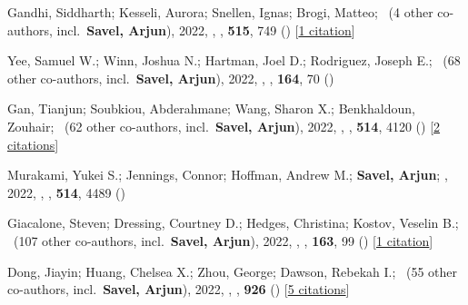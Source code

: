\item[{\color{numcolor}\scriptsize14}] Gandhi, Siddharth; Kesseli, Aurora; Snellen, Ignas; Brogi, Matteo; \etal\ ({4} other co-authors, incl.\ \textbf{Savel, Arjun}), 2022, , \mnras, \textbf{515}, 749 () [\href{https://ui.adsabs.harvard.edu/abs/2022MNRAS.515..749G}{1 citation}]

\item[{\color{numcolor}\scriptsize13}] Yee, Samuel W.; Winn, Joshua N.; Hartman, Joel D.; Rodriguez, Joseph E.; \etal\ ({68} other co-authors, incl.\ \textbf{Savel, Arjun}), 2022, , \aj, \textbf{164}, 70 ()

\item[{\color{numcolor}\scriptsize12}] Gan, Tianjun; Soubkiou, Abderahmane; Wang, Sharon X.; Benkhaldoun, Zouhair; \etal\ ({62} other co-authors, incl.\ \textbf{Savel, Arjun}), 2022, , \mnras, \textbf{514}, 4120 () [\href{https://ui.adsabs.harvard.edu/abs/2022MNRAS.514.4120G}{2 citations}]

\item[{\color{numcolor}\scriptsize11}] Murakami, Yukei S.; Jennings, Connor; Hoffman, Andrew M.; \textbf{Savel, Arjun}; \etal, 2022, , \mnras, \textbf{514}, 4489 ()

\item[{\color{numcolor}\scriptsize10}] Giacalone, Steven; Dressing, Courtney D.; Hedges, Christina; Kostov, Veselin B.; \etal\ ({107} other co-authors, incl.\ \textbf{Savel, Arjun}), 2022, , \aj, \textbf{163}, 99 () [\href{https://ui.adsabs.harvard.edu/abs/2022AJ....163...99G}{1 citation}]

\item[{\color{numcolor}\scriptsize9}] Dong, Jiayin; Huang, Chelsea X.; Zhou, George; Dawson, Rebekah I.; \etal\ ({55} other co-authors, incl.\ \textbf{Savel, Arjun}), 2022, , \apj, \textbf{926} () [\href{https://ui.adsabs.harvard.edu/abs/2022ApJ...926L...7D}{5 citations}]

